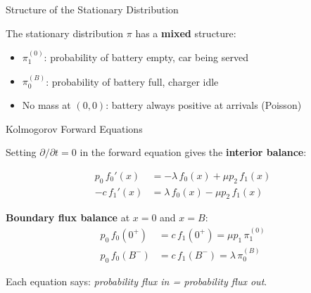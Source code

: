 \documentclass[aspectratio=169]{beamer}
\begin{document}
\begin{frame}{Structure of the Stationary Distribution}

  The stationary distribution $\pi$ has a \textbf{mixed} structure:

  \bigskip
  \begin{center}
  \end{center}

  \medskip
  \begin{itemize}
    \item $\pi_1^{(0)}$: probability of battery empty, car being served
    \item $\pi_0^{(B)}$: probability of battery full, charger idle
    \item No mass at $(0,0)$: battery always positive at arrivals (Poisson)
  \end{itemize}

\end{frame}

\begin{frame}{Kolmogorov Forward Equations}

  Setting $\partial/\partial t = 0$ in the forward equation gives the \textbf{interior balance}:

  \begin{align}
    p_0\, f_0'(x) &= -\lambda\, f_0(x) + \mu p_2\, f_1(x) \tag{E0} \\[4pt]
    -c\, f_1'(x) &= \lambda\, f_0(x) - \mu p_2\, f_1(x) \tag{E1}
  \end{align}

  \bigskip
  \textbf{Boundary flux balance} at $x=0$ and $x=B$:
  \begin{align*}
    p_0\, f_0(0^+) &= c\, f_1(0^+) = \mu p_1\, \pi_1^{(0)} \\[4pt]
    p_0\, f_0(B^-) &= c\, f_1(B^-) = \lambda\, \pi_0^{(B)}
  \end{align*}

  \medskip
  Each equation says: \emph{probability flux in = probability flux out}.

\end{frame}
\end{document}
